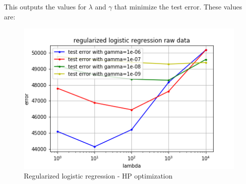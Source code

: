 \documentclass[11pt, a4paper, twoside]{article}
\begin{document}
This outputs the values for $\lambda$ and $\gamma$
that minimize the test error. These values are: 
\begin{figure}[h!]
  \includegraphics[width=\linewidth]{plots/raw_data_reg_log_regr.png}
  \caption{Regularized logistic regression - HP optimization}
  \label{fig:raw_reg_log_regr}
\end{figure}
\end{document}
